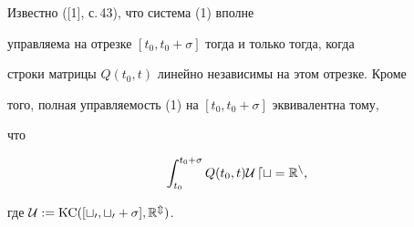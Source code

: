 \begin{note} Известно ([1], с.\,43), что система (1) вполне


управляема на отрезке $[t_0,t_0+\sigma]$ тогда и только тогда, когда


строки матрицы $Q(t_{0},t)$ линейно независимы на этом отрезке. Кроме


того, полная управляемость (1) на $[t_0,t_0+\sigma]$ эквивалентна тому,


что


\begin{equation}


\int_{t_{0} }^{t_{0}+\sigma }Q(t_{0},t)\cal U\,dt=\Rp^n,


\end{equation}


где $\cal U: = \operatorname{KC}( [t_0,t_0+\sigma],\Bbb R^m)$.


\end{note}






